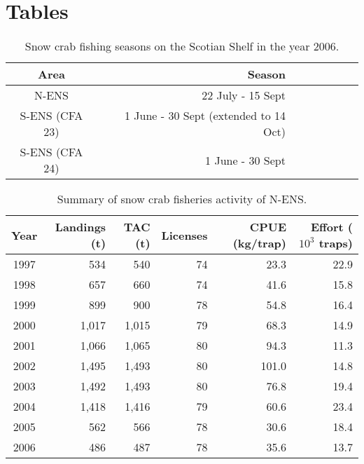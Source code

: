 \documentclass[11pt]{article}
\begin{document}

\clearpage





\clearpage 

\section{Tables}

\vspace{2cm}


\begin{table}[h]
\caption{Snow crab fishing seasons on the Scotian Shelf in the year 2006.}
\label{tab:management.measures}
\begin{center}
\begin{tabular}{c r r r r r r r}
\hline \hline
Area & Season \\
\hline
N-ENS & 22 July - 15 Sept  \\
S-ENS (CFA 23) & 1 June - 30 Sept  (extended to 14 Oct)  \\
S-ENS (CFA 24) & 1 June - 30 Sept  \\
\hline
\end{tabular}
\end{center}
\end{table}


\clearpage \newpage
\begin{table}
\caption{Summary of snow crab fisheries activity of N-ENS.}
\label{tab:fisheries.summary.north}
\begin{center}
\begin{tabular}{c r r r r r}
\hline \hline
Year & Landings (t) & TAC (t) & Licenses & CPUE (kg/trap) & Effort ($10^3$ traps) \\
\hline
1997 &   534 &   540 & 74 & 23.3 & 22.9 \\
1998 &   657 &   660 & 74 & 41.6 & 15.8 \\
1999 &   899 &   900 & 78 & 54.8 & 16.4 \\
2000 & 1,017 & 1,015 & 79 & 68.3 & 14.9 \\
2001 & 1,066 & 1,065 & 80 & 94.3 & 11.3 \\
2002 & 1,495 & 1,493 & 80 & 101.0 & 14.8 \\
2003 & 1,492 & 1,493 & 80 & 76.8 & 19.4 \\
2004 & 1,418 & 1,416 & 79 & 60.6 & 23.4 \\
2005 &   562 &   566 & 78 & 30.6 & 18.4 \\
2006 &   486 &   487 & 78 & 35.6 & 13.7 \\
\hline
\end{tabular}
\end{center}
\end{table}
\end{document}
